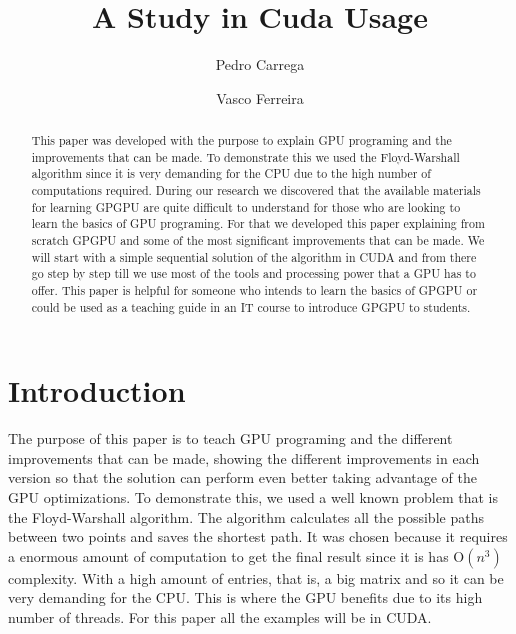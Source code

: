 \documentclass[runningheads]{llncs}
\begin{document}
\title{A Study in Cuda Usage}
\author{Pedro Carrega \and
Vasco Ferreira
}


\maketitle

\begin{abstract}
This paper was developed with the purpose to explain GPU programing and the improvements that can be made. To demonstrate this we used the Floyd-Warshall algorithm since it is very demanding for the CPU due to the high number of computations required. During our research we discovered that the available materials for learning GPGPU are quite difficult to understand for those who are looking to learn the basics of GPU programing. For that we developed this paper explaining from scratch GPGPU and some of the most significant improvements that can be made. We will start with a simple sequential solution of the algorithm in CUDA and from there go step by step till we use most of the tools and processing power that a GPU has to offer. This paper is helpful for someone who intends to learn the basics of GPGPU or could be used as a teaching guide in an IT course to introduce GPGPU to students.

\end{abstract}
%
%
%
\section{Introduction}

The purpose of this paper is to teach GPU programing and the different improvements that can be made, showing the different improvements in each version so that the solution can perform even better taking advantage of the GPU optimizations. To demonstrate this, we used a well known problem that is the Floyd-Warshall algorithm. The algorithm calculates all the possible paths between two points and saves the shortest path. It was chosen because it requires a enormous amount of computation to get the final result since it is has O$(n^{3})$ complexity. With a high amount of entries, that is, a big matrix and so it can be very demanding for the CPU. This is where the GPU benefits due to its high number of threads.
\newline
For this paper all the examples will be in CUDA. %
\end{document}
